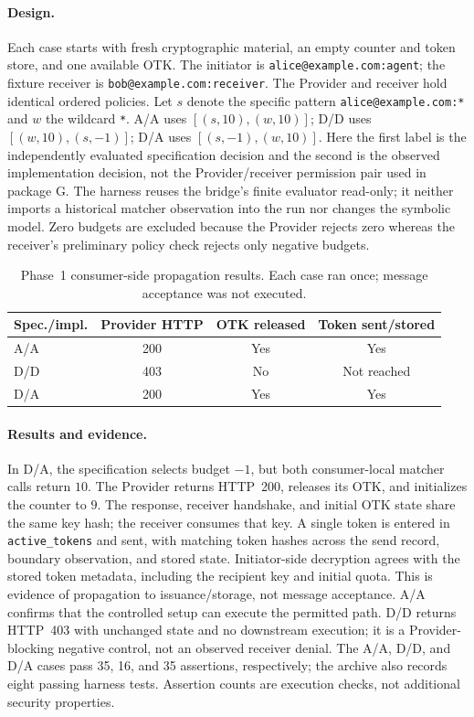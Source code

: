 \paragraph{Design.}
Each case starts with fresh cryptographic material, an empty counter and
token store, and one available OTK. The initiator is
\texttt{alice@\allowbreak example.com:\allowbreak agent}; the fixture receiver is
\texttt{bob@\allowbreak example.com:\allowbreak receiver}. The Provider and receiver hold identical
ordered policies. Let $s$ denote the specific pattern
\texttt{alice@example.com:*} and $w$ the wildcard \texttt{*}.
A/A uses $[(s,10),(w,10)]$; D/D uses $[(w,10),(s,-1)]$;
D/A uses $[(s,-1),(w,10)]$.
Here the first label is the independently evaluated specification decision
and the second is the observed implementation decision, not the
Provider/receiver permission pair used in package G. The harness reuses
the bridge's finite evaluator read-only; it neither imports a historical
matcher observation into the run nor changes the symbolic model.
Zero budgets are excluded because the Provider rejects zero whereas the
receiver's preliminary policy check rejects only negative budgets.

\begin{table}[htbp]
\centering
\small
\begin{tabular}{lccc}
\hline
Spec./impl. & Provider HTTP & OTK released & Token sent/stored \\
\hline
A/A & 200 & Yes & Yes \\
D/D & 403 & No & Not reached \\
D/A & 200 & Yes & Yes \\
\hline
\end{tabular}
\caption{Phase~1 consumer-side propagation results. Each case ran once;
message acceptance was not executed.}
\label{tab:consumer-propagation}
\end{table}

\paragraph{Results and evidence.}
In D/A, the specification selects budget $-1$, but both consumer-local
matcher calls return $10$. The Provider returns HTTP~200, releases its
OTK, and initializes the counter to $9$. The response, receiver handshake,
and initial OTK state share the same key hash; the receiver consumes that
key. A single token is entered in \texttt{active\_tokens} and sent, with
matching token hashes across the send record, boundary observation, and
stored state. Initiator-side decryption agrees with the stored token
metadata, including the recipient key and initial quota. This is evidence
of propagation to issuance/storage, not message acceptance.
A/A confirms that the controlled setup can execute the permitted path.
D/D returns HTTP~403 with unchanged state and no downstream execution;
it is a Provider-blocking negative control, not an observed receiver denial.
The A/A, D/D, and D/A cases pass 35, 16, and 35 assertions, respectively; the archive
also records eight passing harness tests. Assertion counts are execution
checks, not additional security properties.

